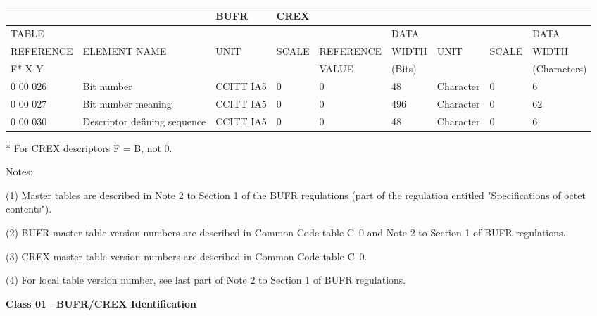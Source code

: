 \begin{longtable}[]{@{}lllllllll@{}}
\toprule
& & BUFR & CREX & & & & &\tabularnewline
\midrule
\endhead
TABLE & & & & & DATA & & & DATA\tabularnewline
REFERENCE & ELEMENT NAME & UNIT & SCALE & REFERENCE & WIDTH & UNIT & SCALE & WIDTH\tabularnewline
F* X Y & & & & VALUE & (Bits) & & & (Characters)\tabularnewline
0 00 026 & Bit number & CCITT IA5 & 0 & 0 & 48 & Character & 0 & 6\tabularnewline
0 00 027 & Bit number meaning & CCITT IA5 & 0 & 0 & 496 & Character & 0 & 62\tabularnewline
0 00 030 & Descriptor defining sequence & CCITT IA5 & 0 & 0 & 48 & Character & 0 & 6\tabularnewline
\bottomrule
\end{longtable}

* For CREX descriptors F = B, not 0.

Notes:

(1) Master tables are described in Note 2 to Section 1 of the BUFR regulations (part of the regulation entitled "Specifications of octet contents").

(2) BUFR master table version numbers are described in Common Code table C--0 and Note 2 to Section 1 of BUFR regulations.

(3) CREX master table version numbers are described in Common Code table C--0.

(4) For local table version number, see last part of Note 2 to Section 1 of BUFR regulations.

\textbf{Class 01 \emph{--}BUFR/CREX Identification}

